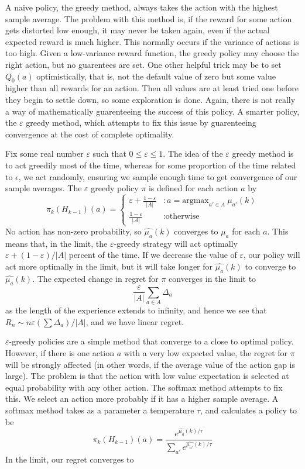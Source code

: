 A naive policy, the greedy method, always takes the action with the highest sample average. The problem with this method is, if the reward for some action gets distorted low enough, it may never be taken again, even if the actual expected reward is much higher. This normally occurs if the variance of actions is too high. Given a low-variance reward function, the greedy policy may choose the right action, but no guarentees are set. One other helpful trick may be to set $Q_0(a)$ optimistically, that is, not the default value of zero but some value higher than all rewards for an action. Then all values are at least tried one before they begin to settle down, so some exploration is done. Again, there is not really a way of mathematically guarenteeing the success of this policy. A smarter policy, the $\varepsilon$ greedy method, which attempts to fix this issue by guarenteeing convergence at the cost of complete optimality.

Fix some real number $\varepsilon$ such that $0 \leq \varepsilon \leq 1$. The idea of the $\varepsilon$ greedy method is to act greedily most of the time, whereas for some proportion of the time related to $\epsilon$, we act randomly, ensuring we sample enough time to get convergence of our sample averages. The $\varepsilon$ greedy policy $\pi$ is defined for each action $a$ by
%
\[ \pi_k(H_{k-1})(a) =
        \begin{cases} \varepsilon + \frac{1 - \varepsilon}{|A|} &: a = \text{argmax}_{a' \in A}\ \widehat{\mu_{a'}}(k)\\
        \frac{1 - \varepsilon}{|\mathcal{A}|} &: \text{otherwise}
        \end{cases} \]
%
No action has non-zero probability, so $\widehat{\mu_a}(k)$ converges to $\mu_a$ for each $a$. This means that, in the limit, the $\varepsilon$-greedy strategy will act optimally $\varepsilon + (1 - \varepsilon)/|A|$ percent of the time. If we decrease the value of $\varepsilon$, our policy will act more optimally in the limit, but it will take longer for $\widehat{\mu_a}(k)$ to converge to $\widehat{\mu_a}(k)$. The expected change in regret for $\pi$ converges in the limit to
%
\[ \frac{\varepsilon}{|A|} \sum_{a \in A} \Delta_a \]
%
as the length of the experience extends to infinity, and hence we see that $R_n \sim n \varepsilon \left( \sum \Delta_a \right)/ |A|$, and we have linear regret.

$\varepsilon$-greedy policies are a simple method that converge to a close to optimal policy. However, if there is one action $a$ with a very low expected value, the regret for $\pi$ will be strongly affected (in other words, if the average value of the action gap is large). The problem is that the action with low value expectation is selected at equal probability with any other action. The softmax method attempts to fix this. We select an action more probably if it has a higher sample average. A softmax method takes as a parameter a temperature $\tau$, and calculates a policy to be
%
\[ \pi_k(H_{k-1})(a) = \frac{e^{\widehat{\mu_a}(k)/\tau}}{\sum_{a'} e^{\widehat{\mu_{a'}}(k)/\tau}}\]
% 
In the limit, our regret converges to

